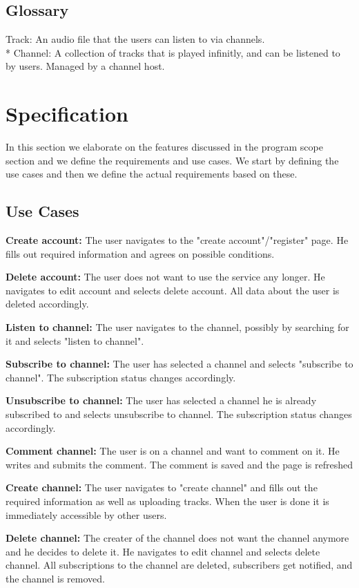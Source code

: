\documentclass[a4paper,11pt,report]{article}
\begin{document}
\subsection{Glossary}
Track: An audio file that the users can listen to via channels. \\*
Channel: A collection of tracks that is played infinitly, and can be listened to by users. Managed by a channel host.

\section{Specification}
In this section we elaborate on the features discussed in the program scope section and we define the requirements and use cases. We start by defining the use cases and then we define the actual requirements based on these. 
\subsection{Use Cases}
\textbf{Create account:}
The user navigates to the "create account"/"register" page. He fills out required information and agrees on possible conditions.

\textbf{Delete account:}
The user does not want to use the service any longer. He navigates to edit account and selects delete account. All data about the user is deleted accordingly.

\textbf{Listen to channel:}
The user navigates to the channel, possibly by searching for it and selects "listen to channel".

\textbf{Subscribe to channel:}
The user has selected a channel and selects "subscribe to channel". The subscription status changes accordingly.

\textbf{Unsubscribe to channel:}
The user has selected a channel he is already subscribed to and selects unsubscribe to channel. The subscription status changes accordingly.

\textbf{Comment channel:}
The user is on a channel and want to comment on it. He writes and submits the comment. The comment is saved and the page is refreshed

\textbf{Create channel:}
The user navigates to "create channel" and fills out the required information as well as uploading tracks. When the user is done it is immediately accessible by other users.

\textbf{Delete channel:}
The creater of the channel does not want the channel anymore and he decides to delete it. He navigates to edit channel and selects delete channel. All subscriptions to the channel are deleted, subscribers get notified, and the channel is removed.
\end{document}

